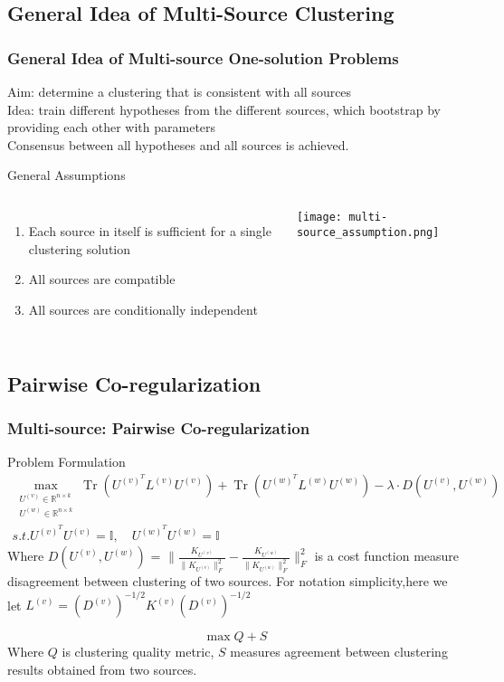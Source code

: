 \documentclass{beamer}
\DeclareMathOperator{\Tr}{Tr}
\begin{document}
\subsection{General Idea of Multi-Source Clustering}
\begin{frame}
\frametitle{General Idea of Multi-source One-solution Problems}
\begin{block}{}
Aim: determine a clustering that is consistent with all sources\\
Idea: train different hypotheses from the different sources, which bootstrap by providing each other with parameters\\
Consensus between all hypotheses and all sources is achieved.\\
\end{block}
\begin{block}{General Assumptions}
\begin{columns}
	\begin{enumerate}
		\item{Each source in itself is sufficient for a single clustering solution}
		\item{All sources are compatible}
		\item{All sources are conditionally independent}
	\end{enumerate}
\texttt{[image: multi-source\_assumption.png]}
\end{columns}
\end{block}

\end{frame}
\subsection{Pairwise Co-regularization}
\begin{frame}
\frametitle{Multi-source: Pairwise Co-regularization}
\begin{block}{Problem Formulation}
\begin{multline}
\max_{\substack{U^{(v)}\in\mathbb{R}^{n\times k}\\
			      U^{(w)}\in\mathbb{R}^{n\times k}}}\Tr(U^{(v)^T}L^{(v)}U^{(v)})+\Tr(U^{(w)^T}L^{(w)}U^{(w)})-\lambda\cdot D(U^{(v)},U^{(w)})\\
			 s.t. U^{(v)^T}U^{(v)}=\mathds{I},\quad U^{(w)^T}U^{(w)}=\mathds{I}
\end{multline}
Where $D(U^{(v)},U^{(w)})$ = $\big\| \frac{K_{U^{(v)}}}{\|K_{U^{(v)}}\|_F^2}-\frac{K_{U^{(w)}}}{\|K_{U^{(w)}}\|_F^2} \big\|_F^{2}$ is a cost function measure disagreement between clustering of two sources.
For notation simplicity,here we let $L^{(v)}=(D^{(v)})^{-1/2}K^{(v)}(D^{(v)})^{-1/2}$
\end{block}

\begin{block}{}
\begin{equation}
\max Q+S
\end{equation}
Where $Q$ is clustering quality metric, $S$ measures agreement between clustering results obtained from two sources.
\end{block}
\end{frame}
\end{document}
